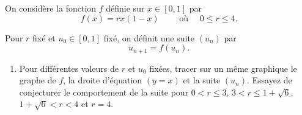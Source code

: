 \begin{frame}
\begin{tp}
On considère la fonction $f$ définie sur $x \in [0,1]$ par 
$$f(x)=rx(1-x) \qquad \text{ où } \quad 0 \le  r \le 4.$$

\pause

Pour $r$ fixé et $u_0 \in [0,1]$ fixé, on définit une suite $(u_n)$ par
$$u_{n+1} = f(u_n).$$

\pause
\begin{enumerate}
  \item Pour différentes valeurs de $r$ et $u_0$ fixées, tracer sur un même graphique
  le graphe de $f$, la droite d'équation $(y=x)$ et la suite $(u_n)$. Essayez de conjecturer 
  le comportement de la suite pour $0<r\le3$, $3< r \le 1+\sqrt{6}$,
  $1+\sqrt{6}< r < 4$ et $r=4$. 
  \end{enumerate}
\end{tp}
\end{frame}


